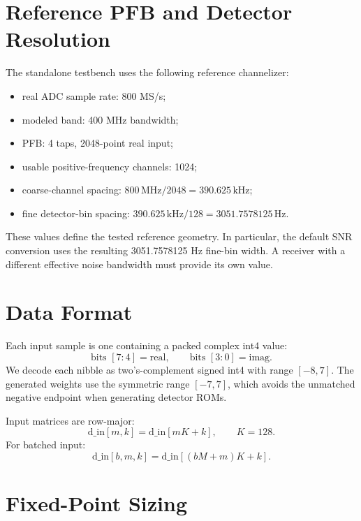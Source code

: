 \documentclass[10pt,letterpaper]{article}
\newcommand{\code}[1]{\texttt{\detokenize{#1}}}
\begin{document}
\section{Reference PFB and Detector Resolution}

The standalone testbench uses the following reference channelizer:
\begin{itemize}
  \item real ADC sample rate: 800 MS/s;
  \item modeled band: 400 MHz bandwidth;
  \item PFB: 4 taps, 2048-point real input;
  \item usable positive-frequency channels: 1024;
  \item coarse-channel spacing: \(800\,\mathrm{MHz}/2048=390.625\,\mathrm{kHz}\);
  \item fine detector-bin spacing: \(390.625\,\mathrm{kHz}/128=3051.7578125\,\mathrm{Hz}\).
\end{itemize}
These values define the tested reference geometry. In particular, the default SNR conversion uses the resulting 3051.7578125 Hz fine-bin width. A receiver with a different effective noise bandwidth must provide its own value.

\section{Data Format}

Each input sample is one \code{int8_t} containing a packed complex int4 value:
\begin{equation}
  \text{bits }[7:4]=\mathrm{real},\qquad \text{bits }[3:0]=\mathrm{imag}.
\end{equation}
We decode each nibble as two's-complement signed int4 with range \([-8,7]\). The generated weights use the symmetric range \([-7,7]\), which avoids the unmatched negative endpoint when generating detector ROMs.

Input matrices are row-major:
\begin{equation}
  \mathrm{d\_in}[m,k]=\mathrm{d\_in}[mK+k],\qquad K=128.
\end{equation}
For batched input:
\begin{equation}
  \mathrm{d\_in}[b,m,k]=\mathrm{d\_in}[(bM+m)K+k].
\end{equation}

\section{Fixed-Point Sizing}
\end{document}
